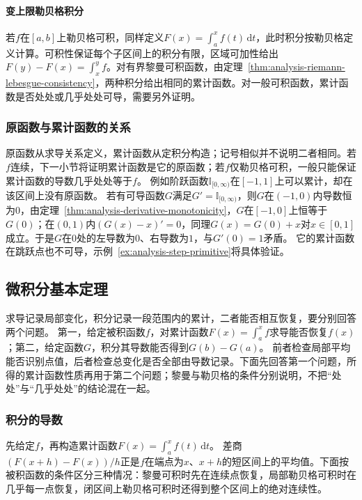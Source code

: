 \paragraph{变上限勒贝格积分}
若$f$在$[a,b]$上勒贝格可积，同样定义$F(x)=\int_a^xf(t)\,\mathrm dt$，此时积分按勒贝格定义计算。可积性保证每个子区间上的积分有限，区域可加性给出$F(y)-F(x)=\int_x^yf$。对有界黎曼可积函数，由定理~\ref{thm:analysis-riemann-lebesgue-consistency}，两种积分给出相同的累计函数。对一般可积函数，累计函数是否处处或几乎处处可导，需要另外证明。

\subsubsection{原函数与累计函数的关系}

原函数从求导关系定义，累计函数从定积分构造；记号相似并不说明二者相同。若$f$连续，下一小节将证明累计函数是它的原函数；若$f$仅勒贝格可积，一般只能保证累计函数的导数几乎处处等于$f$。
例如阶跃函数$\mathbb I_{[0,\infty)}$在$[-1,1]$上可以累计，却在该区间上没有原函数。
若有可导函数$G$满足$G'=\mathbb I_{[0,\infty)}$，则$G$在$(-1,0)$内导数恒为$0$，由定理~\ref{thm:analysis-derivative-monotonicity}，$G$在$[-1,0]$上恒等于$G(0)$；在$(0,1)$内$(G(x)-x)'=0$，同理$G(x)=G(0)+x$对$x\in[0,1]$成立。于是$G$在$0$处的左导数为$0$、右导数为$1$，与$G'(0)=1$矛盾。
它的累计函数在跳跃点也不可导，示例~\ref{ex:analysis-step-primitive}将具体验证。

\subsection{微积分基本定理}
\label{sec:measurable-differentiation-recovery}
\label{sec:analysis-fundamental-calculus}

求导记录局部变化，积分记录一段范围内的累计，二者能否相互恢复，要分别回答两个问题。
第一，给定被积函数$f$，对累计函数$F(x)=\int_a^xf$求导能否恢复$f(x)$；第二，给定函数$G$，积分其导数能否得到$G(b)-G(a)$。
前者检查局部平均能否识别点值，后者检查总变化是否全部由导数记录。下面先回答第一个问题，所得的累计函数性质再用于第二个问题；黎曼与勒贝格的条件分别说明，不把“处处”与“几乎处处”的结论混在一起。

\subsubsection{积分的导数}

先给定$f$，再构造累计函数$F(x)=\int_a^xf(t)\,\mathrm dt$。
差商$(F(x+h)-F(x))/h$正是$f$在端点为$x$、$x+h$的短区间上的平均值。下面按被积函数的条件区分三种情况：黎曼可积时先在连续点恢复，局部勒贝格可积时在几乎每一点恢复，闭区间上勒贝格可积时还得到整个区间上的绝对连续性。


